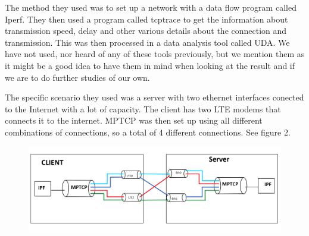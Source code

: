\documentclass[11pt,twocolumn]{article}
\begin{document}
The method they used was to set up a network with a data flow program called Iperf. They then used a program called tcptrace to get the information about transmission speed, delay and other various details about the connection and transmission. This was then processed in a data analysis tool called UDA. We have not used, nor heard of any of these tools previously, but we mention them as it might be a good idea to have them in mind when looking at the result and if we are to do further studies of our own.



The specific scenario they used was a server with two ethernet interfaces conected to the Internet with a lot of capacity. The client has two LTE modems that connects it to the internet. MPTCP was then set up using all different combinations of connections, so a total of 4 different connections. See figure 2.
 
\begin{figure}[ht]
\begin{center}
\includegraphics[scale=0.26]{Figure_1}
\end{center}
\end{figure}
\end{document}
